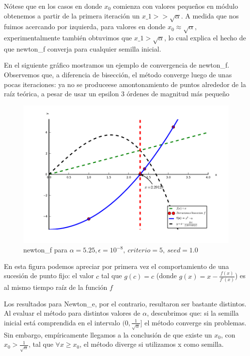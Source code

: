 Nótese que en los casos en donde $x_0$ comienza con valores peque\~nos en módulo obtenemos a partir de la primera iteración un $x\_1 >> \sqrt{\alpha}$. A medida que nos fuimos
acercando por izquierda, para valores en donde $x_{0} \approx \sqrt{\alpha}$,
experimentalmente también obtuvimos que $x\_1 > \sqrt{\alpha}$, lo cual explica el hecho de que newton\_f converja para cualquier semilla inicial.

En el siguiente gráfico mostramos un ejemplo de convergencia de newton\_f. Observemos que, a diferencia de bisección, el método converge luego de unas pocas iteraciones: ya no se 
produceese amontonamiento de puntos alrededor de la raíz teórica, a pesar de usar un epsilon 3 órdenes de magnitud más peque\~no 

\begin{figure}[!h]
	\begin{center}
		  \includegraphics[keepaspectratio]{../Imagenes/exp1/newton_f.pdf}
		  \caption{newton\_f para $\alpha=5.25, \epsilon=10^{-8}, \ criterio = 5, \ seed = 1.0$}
		  \label{fig:contra1}
	\end{center}
\end{figure}
\FloatBarrier

En esta figura podemos apreciar por primera vez el comportamiento de una sucesión de punto fijo: el valor $c$ tal que $g(c)=c$ (donde $g(x) = x - \displaystyle \frac{f(x)}{f'(x)}$) es al mismo tiempo
raíz de la función $f$

Los resultados para Newton\_e, por el contrario, resultaron ser bastante distintos. Al evaluar el método para distintos valores de $\alpha$, descubrimos que: si la semilla inicial está comprendida en el intervalo
$(0,\frac{1}{\sqrt{\alpha}}]$ el método converge sin problemas. Sin embargo, empíricamente llegamos a la conclusión de que existe un $x_0$, con $x_0 > \frac{1}{\sqrt{\alpha}}$, tal que $\forall x \geq x_0$, el método
diverge si utilizamos x como semilla.

